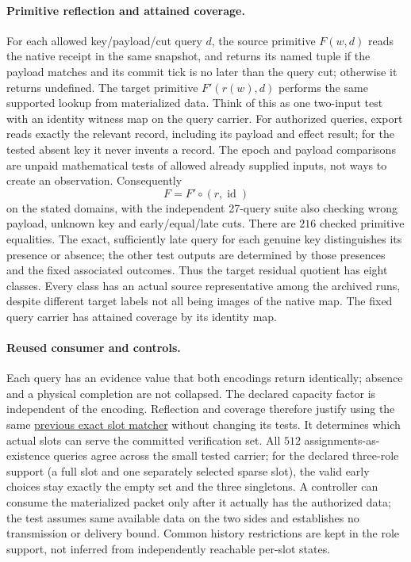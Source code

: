 \documentclass[11pt]{article}
\begin{document}
\paragraph{Primitive reflection and attained coverage.}
For each allowed key/payload/cut query \(d\), the source primitive
\(F(w,d)\) reads the native receipt in the same snapshot, and returns
its named tuple if the payload matches and its commit tick is no later
than the query cut; otherwise it returns undefined.
The target primitive \(F'(r(w),d)\) performs the same supported lookup
from materialized data. Think of this as one two-input test with an
identity witness map on the query carrier. For authorized queries,
export reads exactly the relevant record, including its payload and
effect result; for the tested absent key it never invents a record.
The epoch and payload comparisons are unpaid mathematical tests of
allowed already supplied inputs, not ways to create an observation.
Consequently
\[
                   F= F'\circ(r,\operatorname{id})
\]
on the stated domains, with the independent 27-query suite also
checking wrong payload, unknown key and early/equal/late cuts.
There are \(216\) checked primitive equalities. The exact, sufficiently
late query for each genuine key distinguishes its presence or absence;
the other test outputs are determined by those presences and the fixed
associated outcomes. Thus the target residual quotient has eight
classes. Every class has an actual source representative among the
archived runs, despite different target labels not all being images
of the native map. The fixed query carrier has attained coverage
by its identity map.

\paragraph{Reused consumer and controls.}
Each query has an evidence value that both encodings return identically;
absence and a physical completion are not collapsed. The declared
capacity factor is independent of the encoding. Reflection and
coverage therefore justify using the same
\href{https://github.com/eternal-november/eos-research-programmes/pull/692}
{previous exact slot matcher} without changing its tests.
It determines which actual slots can serve the committed verification
set. All \(512\) assignments-as-existence queries agree across the
small tested carrier; for the declared three-role support (a full slot
and one separately selected sparse slot), the valid early choices stay
exactly the empty set and the three singletons. A controller can consume
the materialized packet only after it actually has the authorized data;
the test assumes same available data on the two sides and establishes
no transmission or delivery bound. Common history restrictions are
kept in the role support, not inferred from independently reachable
per-slot states.
\end{document}
